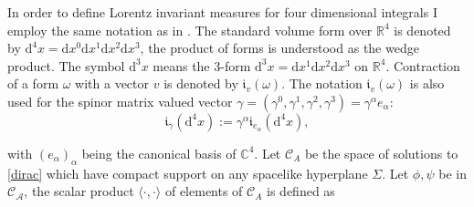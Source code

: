 \documentclass[b5paper,draft,openbib,12pt]{memoir}
\begin{document}
In order to define Lorentz invariant measures for four dimensional integrals I employ the same notation as in \cite{ivp1}. The standard volume form over \(\mathbb{R}^4\) is denoted by \(\mathrm{d}^4 x= \mathrm{d}x^0 \mathrm{d}x^1\mathrm{d}x^2 \mathrm{d}x^3\), the product of forms is understood as the wedge product. The symbol \(\mathrm{d}^3x\)  means the 3-form \(\mathrm{d}^3x= \mathrm{d}x^1\mathrm{d}x^2\mathrm{d}x^3\) on \(\mathbb{R}^4\). Contraction of a form \(\omega\) with a vector \(v\) is denoted by \(\mathfrak{i}_v(\omega)\). The notation \(\mathfrak{i}_v (\omega)\) is also used for the spinor matrix valued vector \(\gamma=(\gamma^0,\gamma^1,\gamma^2,\gamma^3)=\gamma^\alpha e_\alpha\):
\begin{equation}
\mathfrak{i}_\gamma (\mathrm{d}^4x) := \gamma^\alpha \mathfrak{i}_{e_\alpha}(\mathrm{d}^4 x),
\end{equation} 

with \((e_\alpha)_{\alpha}\) being the canonical basis of \(\mathbb{C}^4\). Let \(\mathcal{C}_A\) be the space of solutions to \eqref{dirac} which have compact support on any spacelike hyperplane \(\Sigma\). Let \(\phi, \psi\) be in \(\mathcal{C_A}\), the scalar product \(\langle \cdot, \cdot\rangle\) of elements of \(\mathcal{C}_A\) is defined as


\end{document}
